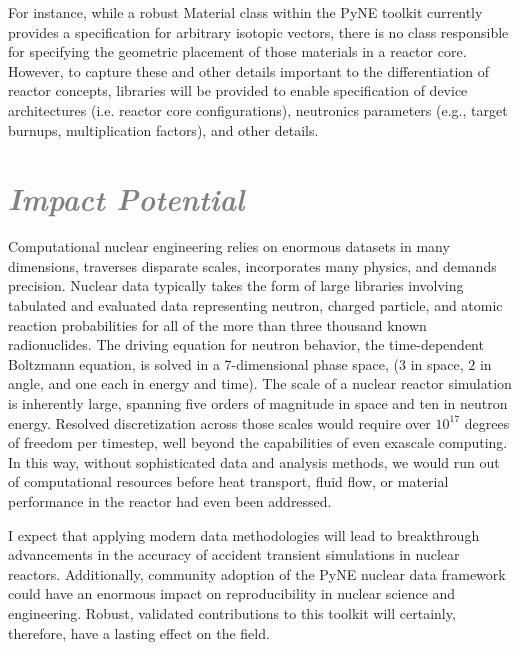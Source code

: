 \documentclass[a4paper, 10pt]{article}
\begin{document}
For instance, while a robust Material class within the PyNE toolkit
currently provides a specification for arbitrary isotopic vectors, there is no
class responsible for specifying the geometric placement of those materials in
a reactor core. However, to capture these and other details important to the
differentiation of reactor concepts, libraries will be provided to enable
specification of device architectures (i.e. reactor core configurations),
neutronics parameters (e.g., target burnups, multiplication factors), and other
details.


\section*{\textcolor{gray}{\it Impact Potential}}
Computational nuclear engineering relies on enormous datasets in many 
dimensions, traverses disparate scales, incorporates many physics, and demands 
precision.  Nuclear data typically takes the form of large libraries involving 
tabulated and evaluated data representing neutron, charged particle, and atomic 
reaction probabilities for all of the more than three thousand known 
radionuclides.  The driving equation for neutron behavior, the time-dependent 
Boltzmann equation, is solved in a 7-dimensional phase space, ($3$ in space, $2$ 
in angle, and one each in energy and time). The scale of a nuclear reactor 
simulation is inherently large, spanning five orders of magnitude in space and 
ten in neutron energy. Resolved discretization across those scales would require 
over $10^{17}$ degrees of freedom per timestep, well beyond the
capabilities of even exascale computing. In this way, without sophisticated
data and analysis methods, we would run out of computational resources before
heat transport, fluid flow, or material performance in the reactor had even
been addressed. 

I expect that applying modern data methodologies will lead to breakthrough 
advancements in the accuracy of accident transient simulations in nuclear 
reactors. Additionally, community adoption of the PyNE nuclear data framework
could have an enormous impact on reproducibility in nuclear science and
engineering. Robust, validated contributions to this toolkit will certainly,
therefore, have a lasting effect on the field. 



\end{document}
